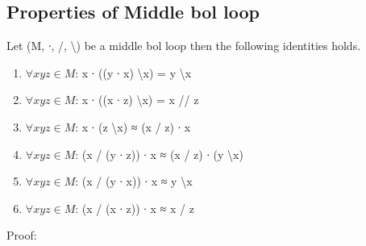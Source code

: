\subsection{Properties of Middle bol loop}
Let (M, ∙, /, \textbackslash ) be a middle bol loop then the following identities holds.
\begin{enumerate}
\item \(\forall x y z \in M\): x ∙ ((y ∙ x) \textbackslash x) = y \textbackslash x 
\item \(\forall x y z \in M\): x ∙ ((x ∙ z) \textbackslash x) = x // z
\item \(\forall x y z \in M\): x ∙ (z \textbackslash x) ≈ (x / z) ∙ x
\item \(\forall x y z \in M\): (x / (y ∙ z)) ∙ x ≈ (x / z) ∙ (y \textbackslash x)
\item \(\forall x y z \in M\): (x / (y ∙ x)) ∙ x ≈ y \textbackslash x
\item \(\forall x y z \in M\): (x / (x ∙ z)) ∙ x ≈ x / z
\end{enumerate}
Proof:
